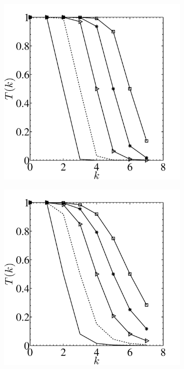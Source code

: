 \begin{figure}
\centering
        \begin{subfigure}[b]{0.32\textwidth}
                \includegraphics[width=\linewidth]{Figure/filter1.pdf}
                \caption{}
                \label{fig:filt1}
        \end{subfigure}%
          \begin{subfigure}[b]{0.32\textwidth}
         \centering
                \includegraphics[width=\linewidth]{Figure/filter2.pdf}

\end{subfigure}
\end{figure}
